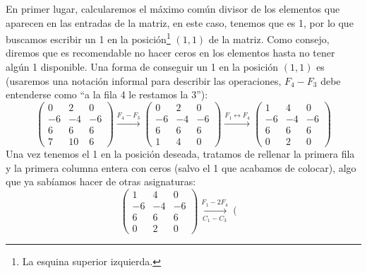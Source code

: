 \begin{ejemplo}
    \noindent
    En primer lugar, calcularemos el máximo común divisor de los elementos que aparecen en las entradas de la matriz, en este caso, tenemos que es 1, por lo que buscamos escribir un 1 en la posición\footnote{La esquina superior izquierda.} $(1,1)$ de la matriz. Como consejo, diremos que es recomendable no hacer ceros en los elementos hasta no tener algún 1 disponible. Una forma de conseguir un 1 en la posición $(1,1)$ es (usaremos una notación informal para describir las operaciones, $F_4-F_3$ debe entenderse como ``a la fila 4 le restamos la 3''):
    \begin{equation*}
        \left(\begin{array}{cccc}
            0 & 2 & 0 \\
            -6 & -4 & -6 \\
            6 & 6 & 6 \\
            7 & 10 & 6  
        \end{array}\right) \xrightarrow{F_4 - F_3}
        \left(\begin{array}{cccc}
            0 & 2 & 0  \\
            -6 & -4 & -6  \\
            6 & 6 & 6  \\
            1 & 4 & 0  
        \end{array}\right) \xrightarrow{F_1 \leftrightarrow F_4}
        \left(\begin{array}{cccc}
            1 & 4 & 0  \\
            -6 & -4 & -6  \\
            6 & 6 & 6  \\
            0 & 2 & 0  
        \end{array}\right) 
    \end{equation*}
    Una vez tenemos el 1 en la posición deseada, tratamos de rellenar la primera fila y la primera columna entera con ceros (salvo el 1 que acabamos de colocar), algo que ya sabíamos hacer de otras asignaturas:
    \begin{equation*}
        \left(\begin{array}{cccc}
            1 & 4 & 0  \\
            -6 & -4 & -6  \\
            6 & 6 & 6  \\
            0 & 2 & 0  
        \end{array}\right) 
        \underset{C_1-C_3}{\xrightarrow{F_1-2F_4}}
        \left(\begin{array}{cccc}

\end{array}
\end{equation*}
\end{ejemplo}
